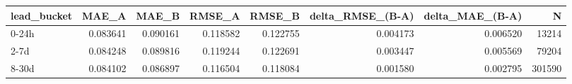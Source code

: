 \begin{tabular}{lrrrrrrr}
\toprule
lead_bucket & MAE_A & MAE_B & RMSE_A & RMSE_B & delta_RMSE_(B-A) & delta_MAE_(B-A) & N \\
\midrule
0-24h & 0.083641 & 0.090161 & 0.118582 & 0.122755 & 0.004173 & 0.006520 & 13214 \\
2-7d & 0.084248 & 0.089816 & 0.119244 & 0.122691 & 0.003447 & 0.005569 & 79204 \\
8-30d & 0.084102 & 0.086897 & 0.116504 & 0.118084 & 0.001580 & 0.002795 & 301590 \\
\bottomrule
\end{tabular}
